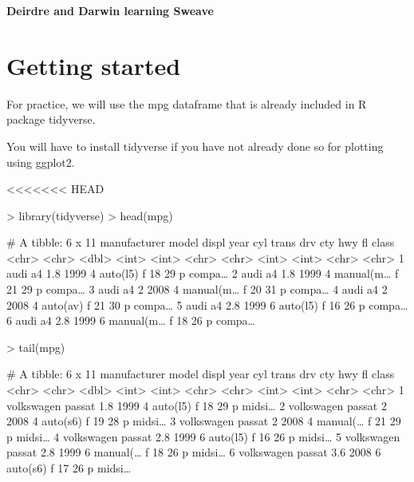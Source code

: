 \documentclass{article}
\begin{document}


\noindent \textbf{\Large{Deirdre and Darwin learning Sweave}}
\author{Deirdre & Darwin }

\section {Getting started}
\newline 

For practice, we will use the mpg dataframe that is already included in R package tidyverse. 

You will have to install tidyverse if you have not already done so for plotting using ggplot2.

<<<<<<< HEAD
\begin{Schunk}
\begin{Sinput}
> library(tidyverse)
> head(mpg)
\end{Sinput}
\begin{Soutput}
# A tibble: 6 x 11
  manufacturer model displ  year   cyl trans     drv     cty   hwy fl    class 
  <chr>        <chr> <dbl> <int> <int> <chr>     <chr> <int> <int> <chr> <chr> 
1 audi         a4      1.8  1999     4 auto(l5)  f        18    29 p     compa…
2 audi         a4      1.8  1999     4 manual(m… f        21    29 p     compa…
3 audi         a4      2    2008     4 manual(m… f        20    31 p     compa…
4 audi         a4      2    2008     4 auto(av)  f        21    30 p     compa…
5 audi         a4      2.8  1999     6 auto(l5)  f        16    26 p     compa…
6 audi         a4      2.8  1999     6 manual(m… f        18    26 p     compa…
\end{Soutput}
\end{Schunk}

\begin{Schunk}
\begin{Sinput}
> tail(mpg)
\end{Sinput}
\begin{Soutput}
# A tibble: 6 x 11
  manufacturer model  displ  year   cyl trans    drv     cty   hwy fl    class 
  <chr>        <chr>  <dbl> <int> <int> <chr>    <chr> <int> <int> <chr> <chr> 
1 volkswagen   passat   1.8  1999     4 auto(l5) f        18    29 p     midsi…
2 volkswagen   passat   2    2008     4 auto(s6) f        19    28 p     midsi…
3 volkswagen   passat   2    2008     4 manual(… f        21    29 p     midsi…
4 volkswagen   passat   2.8  1999     6 auto(l5) f        16    26 p     midsi…
5 volkswagen   passat   2.8  1999     6 manual(… f        18    26 p     midsi…
6 volkswagen   passat   3.6  2008     6 auto(s6) f        17    26 p     midsi…
\end{Soutput}
\end{Schunk}
\end{document}
